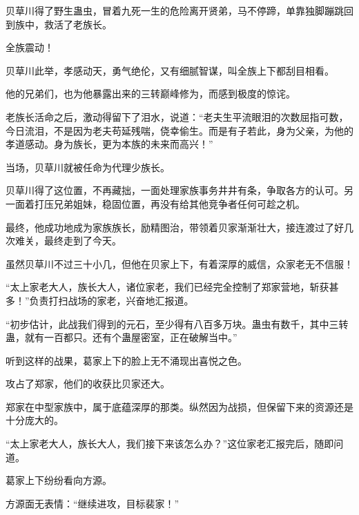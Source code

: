 \begin{this_body}
贝草川得了野生蛊虫，冒着九死一生的危险离开贤弟，马不停蹄，单靠独脚蹦跳回到族中，救活了老族长。

全族震动！

贝草川此举，孝感动天，勇气绝伦，又有细腻智谋，叫全族上下都刮目相看。

他的兄弟们，也为他暴露出来的三转巅峰修为，而感到极度的惊诧。

老族长活命之后，激动得留下了泪水，说道：“老夫生平流眼泪的次数屈指可数，今日流泪，不是因为老夫苟延残喘，侥幸偷生。而是有子若此，身为父亲，为他的孝道感动。身为族长，更为本族的未来而高兴！”

当场，贝草川就被任命为代理少族长。

贝草川得了这位置，不再藏拙，一面处理家族事务井井有条，争取各方的认可。另一面着打压兄弟姐妹，稳固位置，再没有给其他竞争者任何可趁之机。

最终，他成功地成为家族族长，励精图治，带领着贝家渐渐壮大，接连渡过了好几次难关，最终走到了今天。

虽然贝草川不过三十小几，但他在贝家上下，有着深厚的威信，众家老无不信服！

“太上家老大人，族长大人，诸位家老，我们已经完全控制了郑家营地，斩获甚多！”负责打扫战场的家老，兴奋地汇报道。

“初步估计，此战我们得到的元石，至少得有八百多万块。蛊虫有数千，其中三转蛊，就有一百都只。还有个蛊屋密室，正在破解当中。”

听到这样的战果，葛家上下的脸上无不涌现出喜悦之色。

攻占了郑家，他们的收获比贝家还大。

郑家在中型家族中，属于底蕴深厚的那类。纵然因为战损，但保留下来的资源还是十分庞大的。

“太上家老大人，族长大人，我们接下来该怎么办？”这位家老汇报完后，随即问道。

葛家上下纷纷看向方源。

方源面无表情：“继续进攻，目标裴家！”

\end{this_body}

